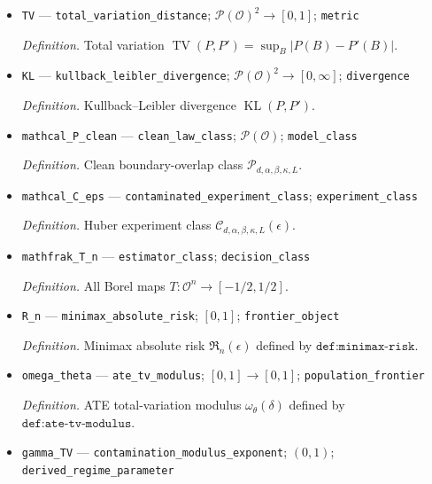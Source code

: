 \documentclass{article}
\begin{document}
\begin{itemize}
  \item \texttt{TV} --- \texttt{total\_\allowbreak{}variation\_\allowbreak{}distance}; \(\mathcal P(\mathcal O)^2\to[0,1]\); \texttt{metric}
  \par\smallskip\noindent\emph{Definition.} Total variation \(\operatorname{TV}(P,P')=\sup_B|P(B)-P'(B)|\).
  \item \texttt{KL} --- \texttt{kullback\_\allowbreak{}leibler\_\allowbreak{}divergence}; \(\mathcal P(\mathcal O)^2\to[0,\infty]\); \texttt{divergence}
  \par\smallskip\noindent\emph{Definition.} Kullback--Leibler divergence \(\operatorname{KL}(P,P')\).
  \item \texttt{mathcal\_\allowbreak{}P\_\allowbreak{}clean} --- \texttt{clean\_\allowbreak{}law\_\allowbreak{}class}; \(\mathcal P(\mathcal O)\); \texttt{model\_\allowbreak{}class}
  \par\smallskip\noindent\emph{Definition.} Clean boundary-overlap class \(\mathcal P_{d,\alpha,\beta,\kappa,L}\).
  \item \texttt{mathcal\_\allowbreak{}C\_\allowbreak{}eps} --- \texttt{contaminated\_\allowbreak{}experiment\_\allowbreak{}class}; \texttt{experiment\_\allowbreak{}class}
  \par\smallskip\noindent\emph{Definition.} Huber experiment class \(\mathcal C_{d,\alpha,\beta,\kappa,L}(\epsilon)\).
  \item \texttt{mathfrak\_\allowbreak{}T\_\allowbreak{}n} --- \texttt{estimator\_\allowbreak{}class}; \texttt{decision\_\allowbreak{}class}
  \par\smallskip\noindent\emph{Definition.} All Borel maps \(T:\mathcal O^n\to[-1/2,1/2]\).
  \item \texttt{R\_\allowbreak{}n} --- \texttt{minimax\_\allowbreak{}absolute\_\allowbreak{}risk}; \([0,1]\); \texttt{frontier\_\allowbreak{}object}
  \par\smallskip\noindent\emph{Definition.} Minimax absolute risk \(\mathfrak R_n(\epsilon)\) defined by \(\texttt{def:minimax-risk}\).
  \item \texttt{omega\_\allowbreak{}theta} --- \texttt{ate\_\allowbreak{}tv\_\allowbreak{}modulus}; \([0,1]\to[0,1]\); \texttt{population\_\allowbreak{}frontier}
  \par\smallskip\noindent\emph{Definition.} ATE total-variation modulus \(\omega_\theta(\delta)\) defined by \(\texttt{def:ate-tv-modulus}\).
  \item \texttt{gamma\_\allowbreak{}TV} --- \texttt{contamination\_\allowbreak{}modulus\_\allowbreak{}exponent}; \((0,1)\); \texttt{derived\_\allowbreak{}regime\_\allowbreak{}parameter}

\end{itemize}
\end{document}
